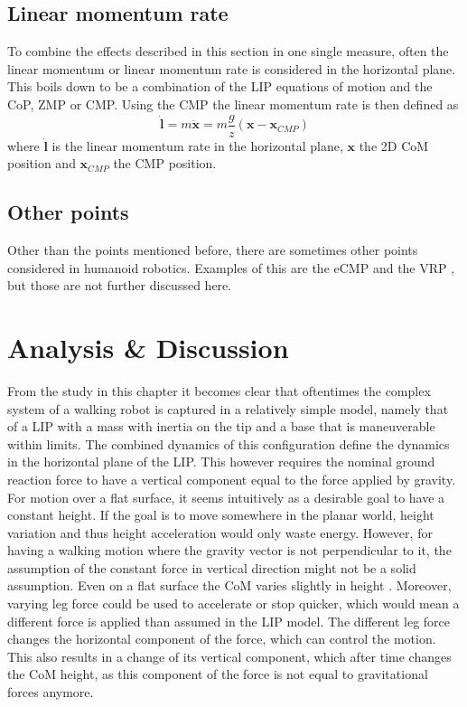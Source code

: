 \subsection{Linear momentum rate}
To combine the effects described in this section in one single measure, often the linear momentum or linear momentum rate is considered in the horizontal plane. This boils down to be a combination of the \ac{LIP} equations of motion and the \ac{CoP}, \ac{ZMP} or \ac{CMP}. Using the \ac{CMP} the linear momentum rate is then defined as
\begin{equation}
\boldsymbol{\dot{l}} = m\boldsymbol{\ddot{x}}= m\frac{g}{z}(\boldsymbol{x}-\boldsymbol{x}_{CMP})
\label{eq:ldot}
\end{equation}
where $\boldsymbol{\dot{l}}$ is the linear momentum rate in the horizontal plane, $\boldsymbol{x}$ the \ac{2D} \ac{CoM} position and $\boldsymbol{x}_{CMP}$ the \ac{CMP} position.
\subsection{Other points}
Other than the points mentioned before, there are sometimes other points considered in humanoid robotics. Examples of this are the \ac{eCMP} and the \ac{VRP} \cite{englsberger2013three}, but those are not further discussed here. 

\section{Analysis \& Discussion}
From the study in this chapter it becomes clear that oftentimes the complex system of a walking robot is captured in a relatively simple model, namely that of a \ac{LIP} with a mass with inertia on the tip and a base that is maneuverable within limits. The combined dynamics of this configuration define the dynamics in the horizontal plane of the \ac{LIP}. This however requires the nominal ground reaction force to have a vertical component equal to the force applied by gravity. For motion over a flat surface, it seems intuitively as a desirable goal to have a constant height. If the goal is to move somewhere in the planar world, height variation and thus height acceleration would only waste energy. However, for having a walking motion where the gravity vector is not perpendicular to it, the assumption of the constant force in vertical direction might not be a solid assumption. Even on a flat surface the \ac{CoM} varies slightly in height \cite{lee1998determinants}. Moreover, varying leg force could be used to accelerate or stop quicker, which would mean a different force is applied than assumed in the \ac{LIP} model. The different leg force changes the horizontal component of the force, which can control the motion. This also results in a change of its vertical component, which after time changes the \ac{CoM} height, as this component of the force is not equal to gravitational forces anymore.